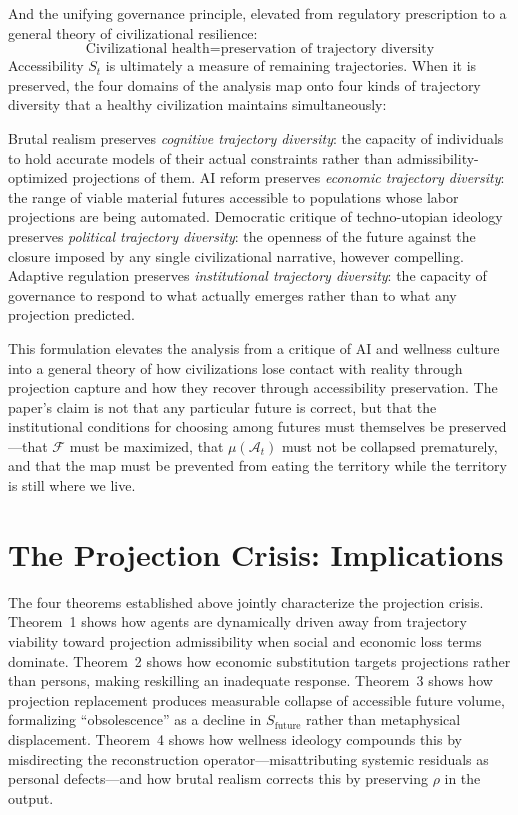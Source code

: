 \documentclass[12pt, a4paper]{article}
\theoremstyle{plain}
\theoremstyle{definition}
\theoremstyle{remark}
\begin{document}
And the unifying governance principle, elevated from regulatory prescription to
a general theory of civilizational resilience:
\[
\boxed{
\text{Civilizational health} = \text{preservation of trajectory diversity}
}
\]
Accessibility $S_t$ is ultimately a measure of remaining trajectories.
When it is preserved, the four domains of the analysis map onto four kinds of
trajectory diversity that a healthy civilization maintains simultaneously:

Brutal realism preserves \emph{cognitive trajectory diversity}: the capacity of
individuals to hold accurate models of their actual constraints rather than
admissibility-optimized projections of them.
AI reform preserves \emph{economic trajectory diversity}: the range of viable
material futures accessible to populations whose labor projections are being automated.
Democratic critique of techno-utopian ideology preserves \emph{political trajectory diversity}:
the openness of the future against the closure imposed by any single civilizational
narrative, however compelling.
Adaptive regulation preserves \emph{institutional trajectory diversity}:
the capacity of governance to respond to what actually emerges rather than to
what any projection predicted.

This formulation elevates the analysis from a critique of AI and wellness culture
into a general theory of how civilizations lose contact with reality through
projection capture and how they recover through accessibility preservation.
The paper's claim is not that any particular future is correct, but that the
institutional conditions for choosing among futures must themselves be preserved---that
$\mathcal{F}$ must be maximized, that $\mu(\mathcal{A}_t)$ must not be collapsed
prematurely, and that the map must be prevented from eating the territory while
the territory is still where we live.

\section{The Projection Crisis: Implications}

The four theorems established above jointly characterize the projection crisis.
Theorem~1 shows how agents are dynamically driven away from trajectory viability
toward projection admissibility when social and economic loss terms dominate.
Theorem~2 shows how economic substitution targets projections rather than persons,
making reskilling an inadequate response.
Theorem~3 shows how projection replacement produces measurable collapse of accessible
future volume, formalizing ``obsolescence'' as a decline in $S_{\mathrm{future}}$
rather than metaphysical displacement.
Theorem~4 shows how wellness ideology compounds this by misdirecting the
reconstruction operator---misattributing systemic residuals as personal defects---and
how brutal realism corrects this by preserving $\rho$ in the output.
\end{document}
